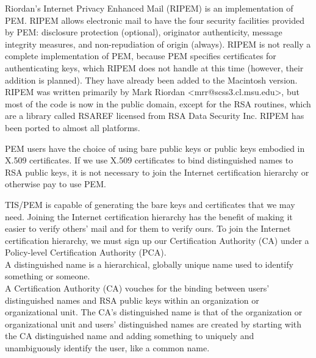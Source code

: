 \begin{htmllist}
    Riordan's Internet Privacy Enhanced Mail (RIPEM) is an implementation
    of PEM. RIPEM allows electronic mail to have the four security
    facilities provided by PEM: disclosure protection (optional),
    originator authenticity, message integrity measures, and
    non-repudiation of origin (always). RIPEM is not really a complete
    implementation of PEM, because PEM specifies certificates for
    authenticating keys, which RIPEM does not handle at this time (however,
    their addition is planned). They have already been added to the
    Macintosh version.\\
    
    RIPEM was written primarily by Mark Riordan <mrr@scss3.cl.msu.edu>, but
    most of the code is now in the public domain, except for the RSA
    routines, which are a library called RSAREF licensed from RSA Data
    Security Inc. RIPEM has been ported to almost all platforms.\\

    
    PEM users have the choice of using bare public keys or public keys
    embodied in X.509 certificates. If we use X.509 certificates to bind
    distinguished names to RSA public keys, it is not necessary to join the
    Internet certification hierarchy or otherwise pay to use PEM.
    
    TIS/PEM is capable of generating the bare keys and certificates that we
    may need. Joining the Internet certification hierarchy has the benefit
    of making it easier to verify others' mail and for them to verify ours.
    To join the Internet certification hierarchy, we must sign up our
    Certification Authority (CA) under a Policy-level Certification
    Authority (PCA).\\
    
    A distinguished name is a hierarchical, globally unique name used to
    identify something or someone.\\
    
    A Certification Authority (CA) vouches for the binding between users'
    distinguished names and RSA public keys within an organization or
    organizational unit. The CA's distinguished name is that of the
    organization or organizational unit and users' distinguished names are
    created by starting with the CA distinguished name and adding something
    to uniquely and unambiguously identify the user, like a common name.\\
    

\end{htmllist}

